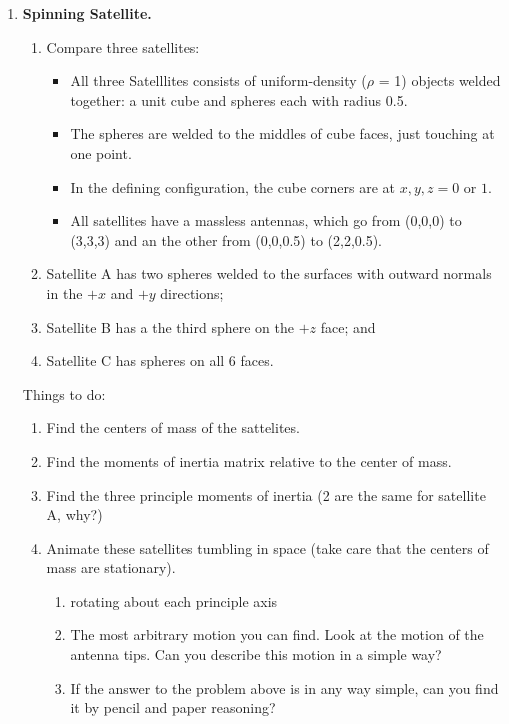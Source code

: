 \documentclass[11pt]{article}
\def\tight{ \setlength{\itemsep}{1.5pt}\setlength{\parskip}{0pt}\setlength{\parsep}{0pt}}
\begin{document}
\begin{enumerate}
\item \textbf{Spinning Satellite.}  \label{satellite1}\\

\begin{enumerate}\tight
\item []  Compare three satellites: 
\begin{itemize}\tight
\item [*] All three Satelllites consists of  uniform-density ($\rho$ = 1) objects welded together: a unit cube and  spheres each with radius 0.5.   
\item [*]The spheres are welded to the middles of cube faces, just touching at one point. \\ 
\item [*] In the defining configuration, the cube corners are at $x,y,z = 0$ or $1$. \\ 
\item [*] All satellites have a massless antennas, which go from  (0,0,0) to (3,3,3) and an the other from
(0,0,0.5) to (2,2,0.5).
\end{itemize}

\item  Satellite  A has two spheres welded to the surfaces with outward normals in the $+x$ and $+y$ directions;
\item Satellite  B  has a the third sphere on the $+z$ face; and
\item Satellite C has spheres on all 6 faces.



\end{enumerate}
\noindent
Things to do: 
\begin{enumerate}[\bf i)]
\item Find the centers of mass of the sattelites.
\item  Find the moments of inertia matrix relative to the center of mass.
\item  Find the three principle moments of inertia (2 are the same for satellite A, why?)
\item Animate these  satellites tumbling in space (take care that the centers of mass are stationary).
\begin{enumerate}[I:]
\item rotating about each principle axis
\item The most arbitrary motion you can find.  Look at the motion of the antenna tips.
Can you describe this motion in a simple way?
\item If the answer to the problem above is in any way simple, can you find it by pencil and paper reasoning?
\end{enumerate}
\end{enumerate}


\end{enumerate}
\end{document}
